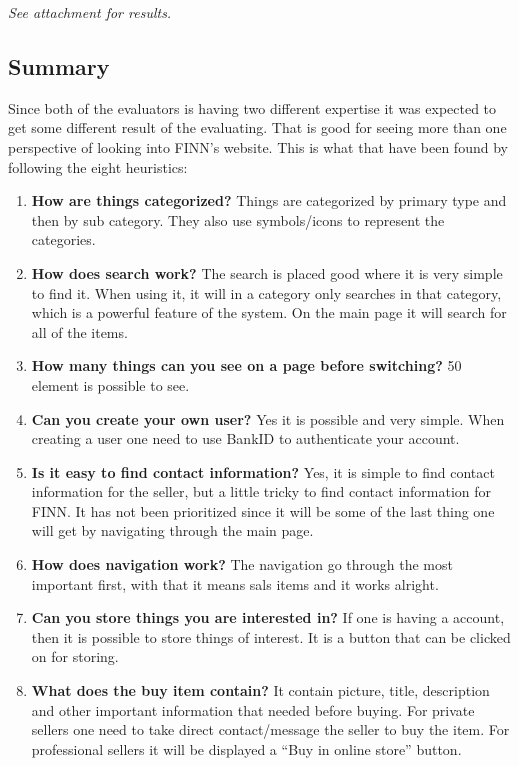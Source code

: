 \textit{See attachment for results.}

\subsection{Summary}
Since both of the evaluators is having two different expertise it was expected to get some different result of the evaluating. That is good for seeing more than one perspective of looking into FINN’s website. This is what that have been found by following the eight heuristics: 
\begin{enumerate}
  \item \textbf{How are things categorized?} Things are categorized by primary type and then by sub category. They also use symbols/icons to represent the categories. 
  \item \textbf{How does search work?} The search is placed good where it is very simple
to find it. When using it, it will in a category only searches in that category, which is a powerful feature of the system. On the main page it will search for all of the items. 

  \item \textbf{How many things can you see on a page before switching?} 50 element is possible to see. 
  \item \textbf{Can you create your own user?} Yes it is possible and very simple. When creating a user one need to use BankID to authenticate your account.
  \item \textbf{Is it easy to find contact information?} Yes, it is simple to find contact information for the seller, but a little tricky to find contact information for FINN. It has not been prioritized since it will be some of the last thing one will get by navigating through the main page. 
  \item \textbf{How does navigation work?} The navigation go through the most important first, with that it means sals items and it works alright. 
  \item \textbf{Can you store things you are interested in?} If one is having a account, then it is possible to store things of interest. It is a button that can be clicked on for storing. 
  \item \textbf{What does the buy item contain?} It contain picture, title, description and other important information that needed before buying. For private sellers one need to take direct contact/message the seller to buy the item. For professional sellers it will be displayed a “Buy in online store” button.
 \end{enumerate}

